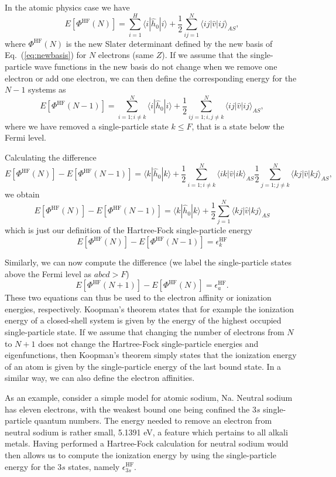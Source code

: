 \documentclass[%
twoside,                 %
final,                   %
10pt]{article}
\begin{document}
In the   atomic physics case we have 
\[
  E[\Phi^{\mathrm{HF}}(N)] 
  = \sum_{i=1}^H \langle i | \hat{h}_0 | i \rangle +
  \frac{1}{2}\sum_{ij=1}^N\langle ij|\hat{v}|ij\rangle_{AS},
\]
where $\Phi^{\mathrm{HF}}(N)$ is the new Slater determinant defined by the new basis of Eq.~(\ref{eq:newbasis})
for $N$ electrons (same $Z$).  If we assume that the single-particle wave functions in the new basis do not change 
when we remove one electron or add one electron, we can then define the corresponding energy for the $N-1$ systems as 
\[
  E[\Phi^{\mathrm{HF}}(N-1)] 
  = \sum_{i=1; i\ne k}^N \langle i | \hat{h}_0 | i \rangle +
  \frac{1}{2}\sum_{ij=1;i,j\ne k}^N\langle ij|\hat{v}|ij\rangle_{AS},
\]
where we have removed a single-particle state $k\le F$, that is a state below the Fermi level.  



Calculating the difference 
\[
  E[\Phi^{\mathrm{HF}}(N)]-   E[\Phi^{\mathrm{HF}}(N-1)] = \langle k | \hat{h}_0 | k \rangle +
  \frac{1}{2}\sum_{i=1;i\ne k}^N\langle ik|\hat{v}|ik\rangle_{AS}  \frac{1}{2}\sum_{j=1;j\ne k}^N\langle kj|\hat{v}|kj\rangle_{AS},
\]
we obtain
\[
  E[\Phi^{\mathrm{HF}}(N)]-   E[\Phi^{\mathrm{HF}}(N-1)] = \langle k | \hat{h}_0 | k \rangle +
  \frac{1}{2}\sum_{j=1}^N\langle kj|\hat{v}|kj\rangle_{AS}
\]
which is just our definition of the Hartree-Fock single-particle energy
\[
  E[\Phi^{\mathrm{HF}}(N)]-   E[\Phi^{\mathrm{HF}}(N-1)] = \epsilon_k^{\mathrm{HF}} 
\]



Similarly, we can now compute the difference (we label the single-particle states above the Fermi level as $abcd > F$)
\[
  E[\Phi^{\mathrm{HF}}(N+1)]-   E[\Phi^{\mathrm{HF}}(N)]= \epsilon_a^{\mathrm{HF}}. 
\]
These two equations can thus be used to the electron affinity or ionization energies, respectively. 
Koopman's theorem states that for example the ionization energy of a closed-shell system is given by the energy of the highest occupied single-particle state.  If we assume that changing the number of electrons from $N$ to $N+1$ does not change the Hartree-Fock single-particle energies and eigenfunctions, then Koopman's theorem simply states that the ionization energy of an atom is given by the single-particle energy of the last bound state. In a similar way, we can also define the electron affinities. 




As an example, consider a simple model for atomic sodium, Na. Neutral sodium has eleven electrons, 
with the weakest bound one being confined the $3s$ single-particle quantum numbers. The energy needed to remove an electron from neutral sodium is rather small, 5.1391 eV, a feature which pertains to all alkali metals.
Having performed a  Hartree-Fock calculation for neutral sodium would then allows us to compute the
ionization energy by using the single-particle energy for the $3s$ states, namely $\epsilon_{3s}^{\mathrm{HF}}$. 
\end{document}
